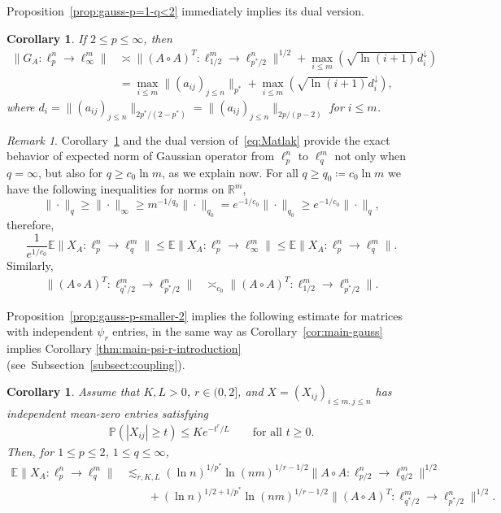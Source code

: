 \documentclass[a4paper]{amsart}
\newtheorem{corollary}[theorem]{Corollary} %
\theoremstyle{definition}
\theoremstyle{remark}
\newtheorem{remark}[theorem]{Remark}
\numberwithin{equation}{section}
\newcommand*{\RR}{\mathbb{R}}
\newcommand*{\EE}{\mathbb{E}}
\newcommand*{\PP}{\mathbb{P}}
\newcommand*{\hadprod}{\mathbin{\circ}} %
\newcommand*{\rearr}{\downarrow} %
\begin{document}
Proposition~\ref{prop:gauss-p=1-q<2} immediately  implies its dual version.

\begin{corollary}	\label{cor:gauss-p>2-q=infty}
If $2\leq p \leq \infty$, then
\begin{align*}
  \|G_A\colon \ell_p^n \to \ell_\infty^m\|
  &\asymp \|(A\hadprod A)^T\colon \ell_{1/2}^m \to \ell_{p^\ast /2}^n\|^{1/2} + \max_{i\le m} (\sqrt{\ln(i+1)} d_i^{\rearr{}})\\
  & = \max_{i\le m} \|(a_{ij})_{j\le n}\|_{p^\ast} + \max_{i\le m} (\sqrt{\ln(i+1)} d_i^{\rearr{}}),
\end{align*}
where $d_i= \|(a_{ij})_{j\le n}\|_{2p^\ast/(2-p^\ast)} = \|(a_{ij})_{j\le n}\|_{2p/(p-2)} $ for $i\leq m$.
\end{corollary}


\begin{remark}
	\label{rem:q=infty}
	Corollary~\ref{cor:gauss-p>2-q=infty} and the dual version of~\eqref{eq:Matlak} provide the exact behavior of expected norm of Gaussian operator from $\ell_p^n$ to $\ell_q^m$ not only when $q=\infty$, but also for $q\ge c_0 \ln m$, as we explain now. For all $q\ge q_0\coloneqq c_0 \ln m$ we have the following inequalities for norms on $\RR^m$,
	\[
	  \|\cdot\|_q\geq \|\cdot\|_\infty \geq m^{-1/q_0} \| \cdot \|_{q_0} = e^{-1/c_0}  \|\cdot\|_{q_0}  \geq e^{-1/c_0}  \|\cdot\|_q ,
	\]
	therefore,
\[	
	\frac{1}{e^{1/c_0}}\EE \|X_A\colon \ell_{p}^n\to\ell_{q}^{m}\|
		 \leq \EE \|X_A\colon \ell_{p}^n\to\ell_\infty^{m}\|
		 \leq  \EE \|X_A\colon \ell_{p}^n\to\ell_{q}^{m}\|.
\]
Similarly,
\begin{align*}
	  \|(A\hadprod A)^T \colon \ell^m_{q^*/2} \to \ell^n_{p^*/2}\| & \asymp_{c_0}   \|(A\hadprod A)^T \colon \ell^m_{1/2} \to \ell^n_{p^*/2}\| .
\end{align*}
\end{remark}






Proposition~\ref{prop:gauss-p-smaller-2} implies the following estimate for matrices with independent $\psi_r$ entries,
in the same way as Corollary~\ref{cor:main-gauss} implies  Corollary \ref{thm:main-psi-r-introduction} (see~Subsection~\ref{subsect:coupling}).


\begin{corollary}
	\label{prop:bounded-p-smaller-2-nopsi}
	Assume that $K,L >0$, $r\in(0,2]$, and $X=(X_{ij})_{i\leq m, j\leq n}$ has independent mean-zero entries satisfying
	\begin{align}\label{eq:psi r random variables2}
	\PP(|X_{ij}|\ge t) \le Ke^{-t^r/L} \qquad \text{for all } t\ge 0.
	\end{align}
	Then, for $1\leq p\leq 2$, $1\leq q \leq \infty$,
\begin{align*}
\EE \|X_A \colon \ell^n_p\to \ell^m_q\|
& \lesssim_{r,K,L}  (\ln n)^{1/p^*}\ln(nm)^{1/r - 1/2} \|A\hadprod A \colon \ell^n_{p/2} \to \ell^m_{q/2}\|^{1/2}\\
&\qquad +  (\ln n)^{1/2+1/p^*}\ln(nm)^{1/r - 1/2}   \|(A\hadprod A)^T \colon \ell^m_{q^*/2} \to \ell^n_{p^*/2}\|^{1/2}. \nonumber
 \end{align*}
\end{corollary}
\end{document}
